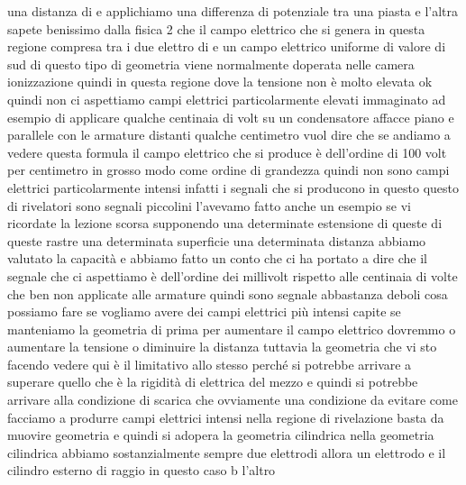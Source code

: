 {una distanza di e applichiamo una differenza di potenziale tra una piasta e l'altra sapete benissimo dalla fisica 2 che il campo elettrico che si genera in questa regione compresa tra i due elettro di e un campo elettrico uniforme di valore di sud di questo tipo di geometria viene normalmente doperata nelle camera ionizzazione quindi in questa regione dove la tensione non è molto elevata ok quindi non ci aspettiamo campi elettrici particolarmente elevati immaginato ad esempio di applicare qualche centinaia di volt su un condensatore affacce piano e parallele con le armature distanti qualche centimetro vuol dire che se andiamo a vedere questa formula il campo elettrico che si produce è dell'ordine di 100 volt per centimetro in grosso modo come ordine di grandezza quindi non sono campi elettrici particolarmente intensi infatti i segnali che si producono in questo questo di rivelatori sono segnali piccolini l'avevamo fatto anche un esempio se vi ricordate la lezione scorsa supponendo una determinate estensione di queste di queste rastre una determinata superficie una determinata distanza abbiamo valutato la capacità e abbiamo fatto un conto che ci ha portato a dire che il segnale che ci aspettiamo è dell'ordine dei millivolt rispetto alle centinaia di volte che ben non applicate alle armature quindi sono segnale abbastanza deboli cosa possiamo fare se vogliamo avere dei campi elettrici più intensi capite se manteniamo la geometria di prima per aumentare il campo elettrico dovremmo o aumentare la tensione o diminuire la distanza tuttavia la geometria che vi sto facendo vedere qui è il limitativo allo stesso perché si potrebbe arrivare a superare quello che è la rigidità di elettrica del mezzo e quindi si potrebbe arrivare alla condizione di scarica che ovviamente una condizione da evitare come facciamo a produrre campi elettrici intensi nella regione di rivelazione basta da muovire geometria e quindi si adopera la geometria cilindrica nella geometria cilindrica abbiamo sostanzialmente sempre due elettrodi allora un elettrodo e il cilindro esterno di raggio in questo caso b l'altro

}
